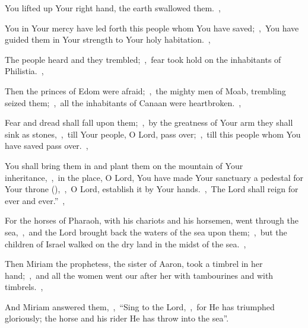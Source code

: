 \documentclass[12pt,twoside,a5paper]{article}
\begin{document}
\begin{normalparskip}
  You lifted up Your right hand, the earth swallowed them.~\sep

  You in Your mercy have led forth this people whom You have saved;~\sep\ You have guided them in Your strength to Your holy habitation.~\sep

  The people heard and they trembled;~\sep\ fear took hold on the inhabitants of Philistia.~\sep

  Then the princes of Edom were afraid;~\sep\ the mighty men of Moab, trembling seized them;~\sep\ all the inhabitants of Canaan were heartbroken.~\sep

  Fear and dread shall fall upon them;~\sep\ by the greatness of Your arm they shall sink as stones,~\sep\ till Your people, O Lord, pass over;~\sep\ till this people whom You have saved pass over.~\sep

  You shall bring them in and plant them on the mountain of Your inheritance,~\sep\ in the place, O Lord, You have made Your sanctuary a pedestal for Your throne (),~\sep\ O Lord, establish it by Your hands.~\sep\ The Lord shall reign for ever and ever.''~\sep

  For the horses of Pharaoh, with his chariots and his horsemen, went through the sea,~\sep\ and the Lord brought back the waters of the sea upon them;~\sep\ but the children of Israel walked on the dry land in the midst of the sea.~\sep

  Then Miriam the prophetess, the sister of Aaron, took a timbrel in her hand;~\sep\ and all the women went our after her with tambourines and with timbrels.~\sep

  And Miriam answered them,~\sep\ ``Sing to the Lord,~\sep\ for He has triumphed gloriously; the horse and his rider He has throw into the sea''.
\end{normalparskip}
\end{document}
